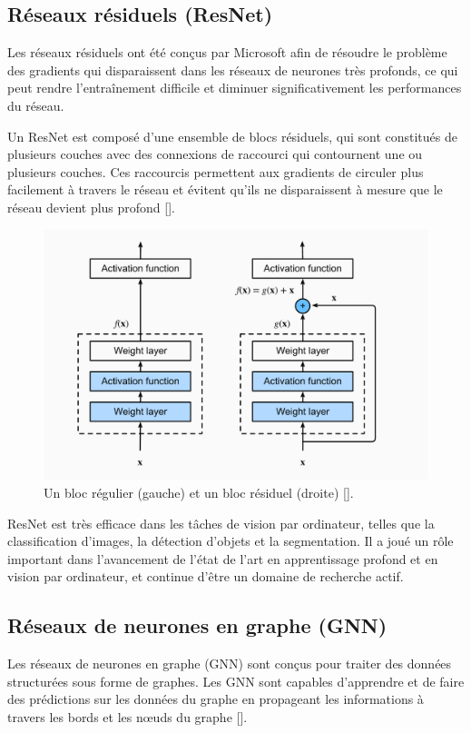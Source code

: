 \subsection{Réseaux résiduels (ResNet)}
Les réseaux résiduels ont été conçus par Microsoft afin de résoudre le problème
des gradients qui disparaissent dans les réseaux de neurones très profonds, ce
qui peut rendre l'entraînement difficile et diminuer significativement les
performances du réseau.

\medskip
Un ResNet est composé d'une ensemble de blocs résiduels, qui sont constitués de plusieurs couches avec des connexions de raccourci qui contournent une ou plusieurs couches. Ces raccourcis permettent aux gradients de circuler plus facilement à travers le réseau et évitent qu'ils ne disparaissent à mesure que le réseau devient plus profond [\cite{He_2016_CVPR}].

\begin{figure}[hbt!]
	\centering
	\includegraphics[width=12cm]{images_pfe/residual-net.png}
	\caption{Un bloc régulier (gauche) et un bloc résiduel (droite) [\cite{dong_niu_li_xie_zou_ye_wei_pan_2022}].}
	\label{fig:residual-net}
\end{figure}
\FloatBarrier

\medskip
ResNet est très efficace dans les tâches de vision par ordinateur, telles que la classification d'images, la détection d'objets et la segmentation. Il a joué un rôle important dans l'avancement de l'état de l'art en apprentissage profond et en vision par ordinateur, et continue d'être un domaine de recherche actif.

\subsection{Réseaux de neurones en graphe (GNN)}
Les réseaux de neurones en graphe (GNN) sont conçus pour traiter des données
structurées sous forme de graphes. Les GNN sont capables d'apprendre et de
faire des prédictions sur les données du graphe en propageant les informations
à travers les bords et les nœuds du graphe [\cite{ZHOU202057}].

